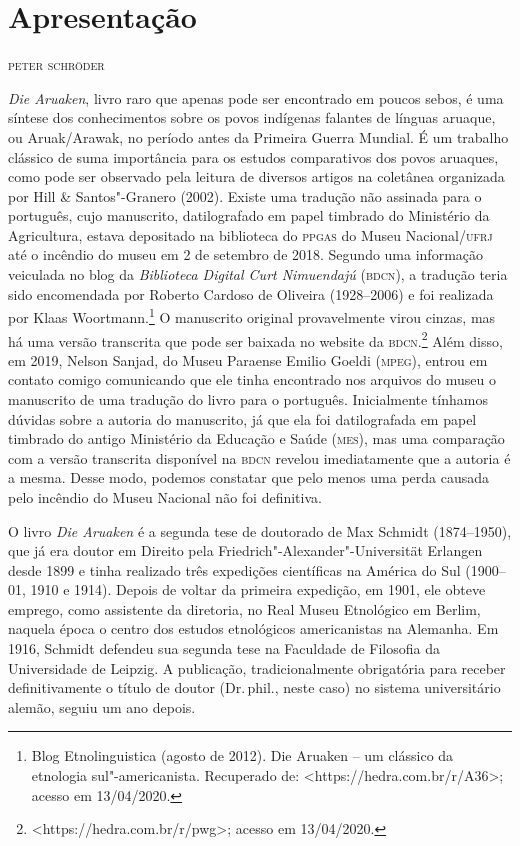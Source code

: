 \chapter[Apresentação, \emph{por Peter Schröder}]{Apresentação }

\begin{flushright}
\textsc{peter schröder}\medskip
\end{flushright}

\noindent{}\emph{Die Aruaken}, livro raro que apenas pode ser encontrado em poucos
sebos, é uma síntese dos conhecimentos sobre os povos indígenas falantes
de línguas aruaque, ou Aruak/Arawak, no período antes da Primeira
Guerra Mundial. É um trabalho clássico de suma importância para os
estudos comparativos dos povos aruaques, como pode ser observado pela
leitura de diversos artigos na coletânea organizada por Hill \&
Santos"-Granero (2002). Existe uma tradução não assinada para o
português, cujo manuscrito, datilografado em papel timbrado do
Ministério da Agricultura, estava depositado na biblioteca do \textsc{ppgas} do
Museu Nacional/\textsc{ufrj} até o incêndio do museu em 2 de setembro de 2018.
Segundo uma informação veiculada no blog da \emph{Biblioteca Digital
Curt Nimuendajú} (\textsc{bdcn}), a tradução teria sido encomendada por Roberto
Cardoso de Oliveira (1928--2006) e foi realizada por Klaas
Woortmann.\footnote{Blog Etnolinguistica (agosto de 2012). Die Aruaken --
  um clássico da etnologia sul"-americanista. Recuperado de:
  \textless{}https://hedra.com.br/r/A36\textgreater{};
  acesso em 13/04/2020.} O manuscrito original provavelmente virou
cinzas, mas há uma versão transcrita que pode ser baixada no website da
\textsc{bdcn}.\footnote{\textless{}https://hedra.com.br/r/pwg\textgreater{};
  acesso em 13/04/2020.} Além disso, em 2019, Nelson Sanjad, do Museu
Paraense Emilio Goeldi (\textsc{mpeg}), entrou em contato comigo comunicando que
ele tinha encontrado nos arquivos do museu o manuscrito de uma tradução
do livro para o português. Inicialmente tínhamos dúvidas sobre a
autoria do manuscrito, já que ela foi datilografada em papel timbrado do
antigo Ministério da Educação e Saúde (\textsc{mes}), mas uma comparação com a
versão transcrita disponível na \textsc{bdcn} revelou imediatamente que a autoria
é a mesma. Desse modo, podemos constatar que pelo menos uma perda
causada pelo incêndio do Museu Nacional não foi definitiva.

O livro \emph{Die Aruaken} é a segunda tese de doutorado de Max Schmidt
(1874--1950), que já era doutor em Direito pela
Friedrich"-Alexander"-Universität Erlangen desde 1899 e tinha realizado
três expedições científicas na América do Sul (1900--01, 1910 e 1914).
Depois de voltar da primeira expedição, em 1901, ele obteve emprego,
como assistente da diretoria, no Real Museu Etnológico em Berlim,
naquela época o centro dos estudos etnológicos americanistas na
Alemanha. Em 1916, Schmidt defendeu sua segunda tese na Faculdade de
Filosofia da Universidade de Leipzig. A publicação, tradicionalmente
obrigatória para receber definitivamente o título de doutor (Dr.\,phil.,
neste caso) no sistema universitário alemão, seguiu um ano depois.


